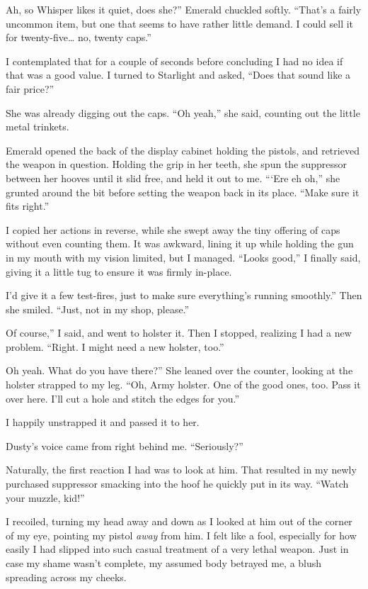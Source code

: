 \leavevmode{}Ah, so Whisper likes it quiet, does she?” Emerald chuckled softly. “That’s a fairly uncommon item, but one that seems to have rather little demand. I could sell it for twenty-five… no, twenty caps.”

I contemplated that for a couple of seconds before concluding I had no idea if that was a good value. I turned to Starlight and asked, “Does that sound like a fair price?”

She was already digging out the caps. “Oh yeah,” she said, counting out the little metal trinkets.

Emerald opened the back of the display cabinet holding the pistols, and retrieved the weapon in question. Holding the grip in her teeth, she spun the suppressor between her hooves until it slid free, and held it out to me. “‘Ere eh oh,” she grunted around the bit before setting the weapon back in its place. “Make sure it fits right.”

I copied her actions in reverse, while she swept away the tiny offering of caps without even counting them. It was awkward, lining it up while holding the gun in my mouth with my vision limited, but I managed. “Looks good,” I finally said, giving it a little tug to ensure it was firmly in-place.

\leavevmode{}I’d give it a few test-fires, just to make sure everything’s running smoothly.” Then she smiled. “Just, not in my shop, please.”

\leavevmode{}Of course,” I said, and went to holster it. Then I stopped, realizing I had a new problem. “Right. I might need a new holster, too.”

\leavevmode{}Oh yeah. What do you have there?” She leaned over the counter, looking at the holster strapped to my leg. “Oh, Army holster. One of the good ones, too. Pass it over here. I’ll cut a hole and stitch the edges for you.”

I happily unstrapped it and passed it to her.

Dusty’s voice came from right behind me. “Seriously?”

Naturally, the first reaction I had was to look at him. That resulted in my newly purchased suppressor smacking into the hoof he quickly put in its way. “Watch your muzzle, kid!”

I recoiled, turning my head away and down as I looked at him out of the corner of my eye, pointing my pistol \textit{away} from him. I felt like a fool, especially for how easily I had slipped into such casual treatment of a very lethal weapon. Just in case my shame wasn’t complete, my assumed body betrayed me, a blush spreading across my cheeks.

